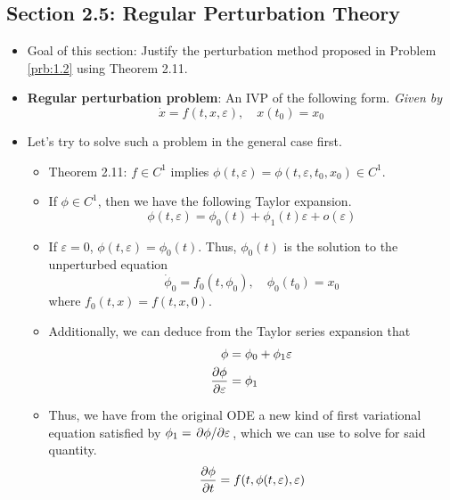\documentclass[../notes.tex]{subfiles}
\begin{document}
\subsection*{Section 2.5: Regular Perturbation Theory}
\begin{itemize}
    \item {}Goal of this section: Justify the perturbation method proposed in Problem \ref{prb:1.2} using Theorem 2.11.
    \item \textbf{Regular perturbation problem}: An IVP of the following form. \emph{Given by}
    \begin{equation*}
        \dot{x} = f(t,x,\varepsilon)
        ,\quad
        x(t_0) = x_0
    \end{equation*}
    \item Let's try to solve such a problem in the general case first.
    \begin{itemize}
        \item Theorem 2.11: $f\in C^1$ implies $\phi(t,\varepsilon)=\phi(t,\varepsilon,t_0,x_0)\in C^1$.
        \item If $\phi\in C^1$, then we have the following Taylor expansion.
        \begin{equation*}
            \phi(t,\varepsilon) = \phi_0(t)+\phi_1(t)\varepsilon+o(\varepsilon)
        \end{equation*}
        \item If $\varepsilon=0$, $\phi(t,\varepsilon)=\phi_0(t)$. Thus, $\phi_0(t)$ is the solution to the unperturbed equation
        \begin{equation*}
            \dot{\phi}_0 = f_0(t,\phi_0)
            ,\quad
            \phi_0(t_0) = x_0
        \end{equation*}
        where $f_0(t,x)=f(t,x,0)$.
        \item Additionally, we can deduce from the Taylor series expansion that
        \begin{align*}
            \phi &= \phi_0+\phi_1\varepsilon\\
            \pdv{\phi}{\varepsilon} &= \phi_1
        \end{align*}
        \item Thus, we have from the original ODE a new kind of first variational equation satisfied by $\phi_1=\pdv*{\phi}{\varepsilon}$, which we can use to solve for said quantity.
        \begin{align*}
            \pdv{\phi}{t} &= f(t,\phi(t,\varepsilon),\varepsilon)\\

\end{align*}
\end{itemize}
\end{itemize}
\end{document}
